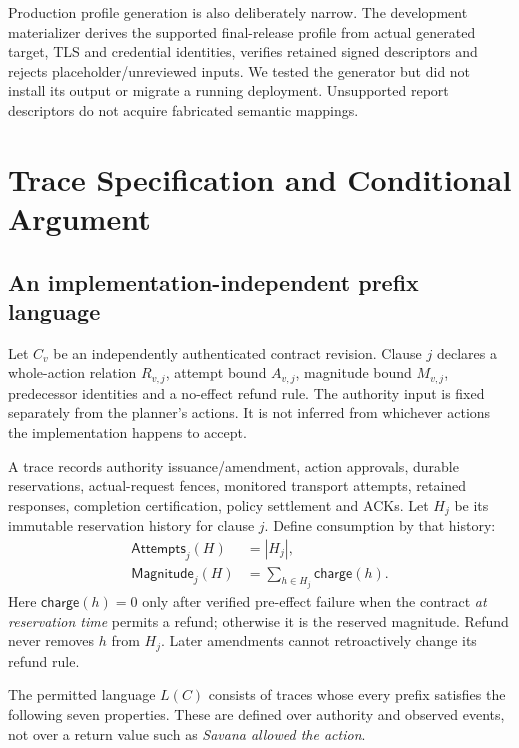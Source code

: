 \documentclass[letterpaper,twocolumn,10pt]{article}
\begin{document}
Production profile generation is also deliberately narrow. The development
materializer derives the supported final-release profile from actual generated
target, TLS and credential identities, verifies retained signed descriptors and
rejects placeholder/unreviewed inputs. We tested the generator but did not install
its output or migrate a running deployment. Unsupported report descriptors do
not acquire fabricated semantic mappings.

\section{Trace Specification and Conditional Argument}
\label{sec:argument}

\subsection{An implementation-independent prefix language}

Let $C_v$ be an independently authenticated contract revision. Clause $j$
declares a whole-action relation $R_{v,j}$, attempt bound $A_{v,j}$, magnitude
bound $M_{v,j}$, predecessor identities and a no-effect refund rule.
The authority input is fixed separately from the planner's actions. It is not
inferred from whichever actions the implementation happens to accept.

A trace records authority issuance/amendment, action approvals, durable
reservations, actual-request fences, monitored transport attempts, retained
responses, completion certification, policy settlement and ACKs. Let $H_j$
be its immutable reservation history for clause $j$. Define consumption by
that history:
\begin{align}
  \mathsf{Attempts}_j(H) &= |H_j|,\\
  \mathsf{Magnitude}_j(H) &= \sum_{h\in H_j} \mathsf{charge}(h).
\end{align}
Here $\mathsf{charge}(h)=0$ only after verified pre-effect failure when the
contract \emph{at reservation time} permits a refund; otherwise it is the
reserved magnitude. Refund never removes $h$ from $H_j$. Later amendments
cannot retroactively change its refund rule.

The permitted language $L(C)$ consists of traces whose every prefix satisfies
the following seven properties. These are defined over authority and observed
events, not over a return value such as \emph{Savana allowed the action}.
\end{document}
